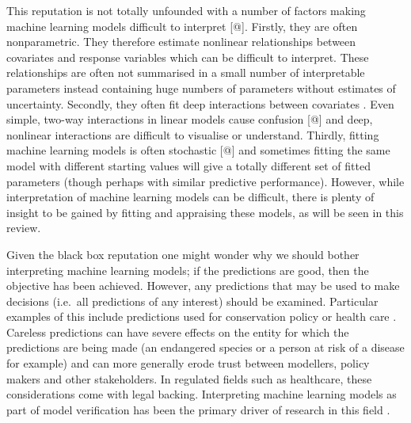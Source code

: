 \documentclass[10pt,]{article}
\begin{document}
This reputation is not totally unfounded with a number of factors making machine learning models difficult to interpret {[}@{]}. Firstly, they are often nonparametric. They therefore estimate nonlinear relationships between covariates and response variables which can be difficult to interpret. These relationships are often not summarised in a small number of interpretable parameters instead containing huge numbers of parameters without estimates of uncertainty. Secondly, they often fit deep interactions between covariates \citep{lunetta2004screening}. Even simple, two-way interactions in linear models cause confusion {[}@{]} and deep, nonlinear interactions are difficult to visualise or understand. Thirdly, fitting machine learning models is often stochastic {[}@{]} and sometimes fitting the same model with different starting values will give a totally different set of fitted parameters (though perhaps with similar predictive performance). However, while interpretation of machine learning models can be difficult, there is plenty of insight to be gained by fitting and appraising these models, as will be seen in this review.

Given the black box reputation one might wonder why we should bother interpreting machine learning models; if the predictions are good, then the objective has been achieved. However, any predictions that may be used to make decisions (i.e.~all predictions of any interest) should be examined. Particular examples of this include predictions used for conservation policy or health care \citep{vayena2018machine}. Careless predictions can have severe effects on the entity for which the predictions are being made (an endangered species or a person at risk of a disease for example) and can more generally erode trust between modellers, policy makers and other stakeholders. In regulated fields such as healthcare, these considerations come with legal backing. Interpreting machine learning models as part of model verification has been the primary driver of research in this field \citep{molnar, ribeiro2016should}.
\end{document}
